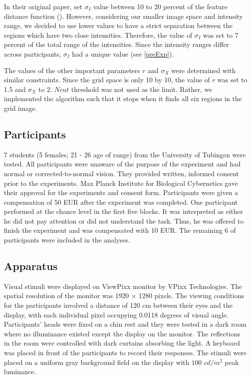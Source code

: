 \documentclass{article}
\begin{document}
In their original paper, \citeauthor{RN165} set $\sigma_I$ value between 10 to 20 percent of the feature distance function (\citeyear{RN165}). However, considering our smaller image space and intensity range, we decided to use lower values to have a strict separation between the regions which have two close intensities. Therefore, the value of $\sigma_I$ was set to 7 percent of the total range of the intensities. Since the intensity ranges differ across participants, $\sigma_I$ had a unique value (see \ref{preExp}).

The values of the other important parameters $r$ and $\sigma_X$ were determined with similar constraints. Since the grid space is only 10 by 10, the value of $r$ was set to 1.5 and $\sigma_X$ to 2. $Ncut$ threshold was not used as the limit. Rather, we implemented the algorithm such that it stops when it finds all six regions in the grid image. 

\subsection{Participants}
7 students (5 females; 21 - 26 age of range) from the University of Tubingen were tested. All participants were unaware of the purpose of the experiment and had normal or corrected-to-normal vision. They provided written, informed consent prior to the experiments. Max Planck Institute for Biological Cybernetics gave their approval for the experiments and consent form. Participants were given a compensation of 50 EUR after the experiment was completed. One participant performed at the chance level in the first five blocks. It was interpreted as either he did not pay attention or did not understand the task. Thus, he was offered to finish the experiment and was compensated with 10 EUR. The remaining 6 of participants were included in the analyses.

\subsection{Apparatus}
Visual stimuli were displayed on ViewPixx monitor by VPixx Technologies. The spatial resolution of the monitor was 1920 $\times$ 1280 pixels. The viewing conditions for the participants involved a distance of 120 cm between their eyes and the display, with each individual pixel occupying 0.0118 degrees of visual angle. Participants' heads were fixed on a chin rest and they were tested in a dark room where no illuminance existed except the display on the monitor. The reflections in the room were controlled with dark curtains absorbing the light. A keyboard was placed in front of the participants to record their responses. The stimuli were placed on a uniform gray background field on the display with $100$ $cd/m^2$ peak luminance. 
\end{document}
